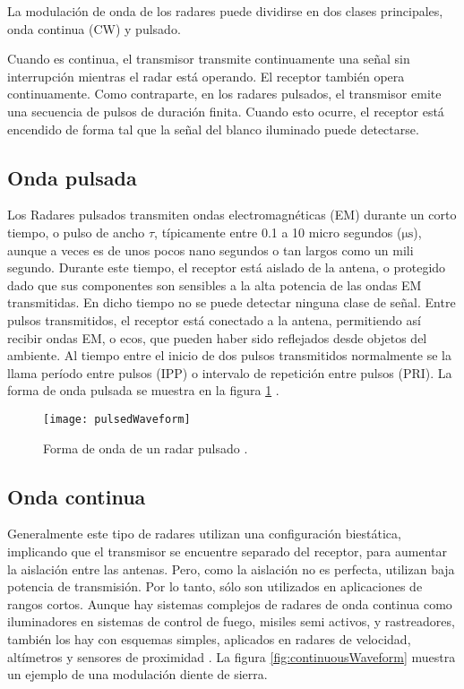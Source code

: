 La modulación de onda de los radares puede dividirse en dos clases principales, onda continua (CW) y pulsado.

Cuando es continua, el transmisor transmite continuamente una señal sin interrupción mientras el radar está operando. El receptor también opera continuamente. Como contraparte, en los radares pulsados, el transmisor emite una secuencia de pulsos de duración finita. Cuando esto ocurre, el receptor está encendido de forma tal que la señal del blanco iluminado puede detectarse.


\subsection{Onda pulsada}

Los Radares pulsados transmiten ondas electromagnéticas (EM) durante un corto tiempo, o pulso de ancho $\tau$, típicamente entre 0.1 a 10 micro segundos ($\si{\us}$), aunque a veces es de unos pocos nano segundos o tan largos como un mili segundo. Durante este tiempo, el receptor está aislado de la antena, o protegido dado que sus componentes son sensibles a la alta potencia de las ondas EM transmitidas. En dicho tiempo no se puede detectar ninguna clase de señal. Entre pulsos transmitidos, el receptor está conectado a la antena, permitiendo así recibir ondas EM, o ecos, que pueden haber sido reflejados desde objetos del ambiente. Al tiempo entre el inicio de dos pulsos transmitidos normalmente se la llama período entre pulsos (IPP) o intervalo de repetición entre pulsos (PRI). La forma de onda pulsada se muestra en la figura \ref{fig:pulsedWaveform} \cite{Richards2010}.

\begin{figure}
 \centering
 \texttt{[image: pulsedWaveform]}
 \caption{Forma de onda de un radar pulsado \cite{Richards2010}.}
 \label{fig:pulsedWaveform}
\end{figure}


\subsection{Onda continua}

Generalmente este tipo de radares utilizan una configuración biestática, implicando que el transmisor se encuentre separado del receptor, para aumentar la aislación entre las antenas. Pero, como la aislación no es perfecta, utilizan baja potencia de transmisión. Por lo tanto, sólo son utilizados en aplicaciones de rangos cortos. Aunque hay sistemas complejos de radares de onda continua como iluminadores en sistemas de control de fuego, misiles semi activos, y rastreadores, también los hay con esquemas simples, aplicados en radares de velocidad, altímetros y sensores de proximidad \cite{Richards2010}. La figura \ref{fig:continuousWaveform} muestra un ejemplo de una modulación diente de sierra.


